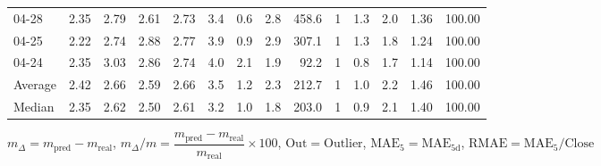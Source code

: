 \begin{threeparttable}
{\begin{tabular}{lrrrrrrrrrrrrr}
  04-28 &          2.35 &          2.79 &          2.61 &        2.73 &                 3.4 &                 0.6 &        2.8 &        458.6 &              1 &                 1.3 &              2.0 &            1.36 &                 100.00 \\
  04-25 &          2.22 &          2.74 &          2.88 &        2.77 &                 3.9 &                 0.9 &        2.9 &        307.1 &              1 &                 1.3 &              1.8 &            1.24 &                 100.00 \\
  04-24 &          2.35 &          3.03 &          2.86 &        2.74 &                 4.0 &                 2.1 &        1.9 &         92.2 &              1 &                 0.8 &              1.7 &            1.14 &                 100.00 \\
Average &          2.42 &          2.66 &          2.59 &        2.66 &                 3.5 &                 1.2 &        2.3 &        212.7 &              1 &                 1.0 &              2.2 &            1.46 &                 100.00 \\
 Median &          2.35 &          2.62 &          2.50 &        2.61 &                 3.2 &                 1.0 &        1.8 &        203.0 &              1 &                 0.9 &              2.1 &            1.40 &                 100.00 \\
\bottomrule
\end{tabular}
}
\begin{tablenotes}\footnotesize
\item $m_\Delta=m_{\text{pred}}-m_{\text{real}}$,
$m_\Delta/m=\dfrac{m_{\text{pred}}-m_{\text{real}}}{m_{\text{real}}}\times100$,
$\mathrm{Out}=\text{Outlier}$,
$\mathrm{MAE}_5=\mathrm{MAE}_{5\text{d}}$,
$\mathrm{RMAE}=\mathrm{MAE}_5/\text{Close}$
\end{tablenotes}
\end{threeparttable}
\endgroup

